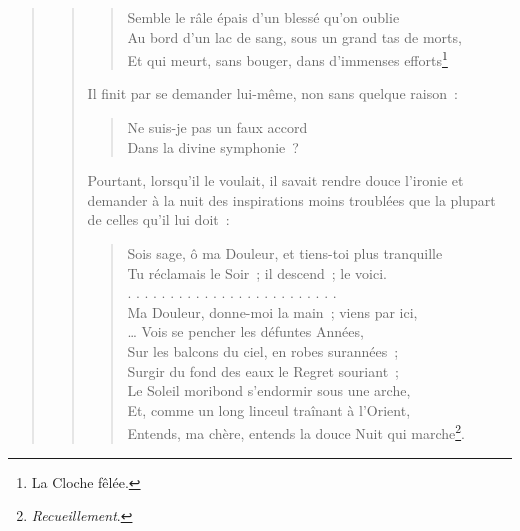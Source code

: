 \documentclass[french,twoside]{book} %
\begin{document}
\begin{verse}
\begin{verse}
\begin{verse}
Semble le râle épais d’un blessé qu’on oublie\\
Au bord d’un lac de sang, sous un grand tas de morts,\\
Et qui meurt, sans bouger, dans d’immenses efforts\footnote{La Cloche fêlée.} \\
\end{verse}

\noindent Il finit par se demander lui-même, non sans quelque raison :\par


\begin{verse}
Ne suis-je pas un faux accord\\
Dans la divine symphonie ?\\
\end{verse}

\noindent Pourtant, lorsqu’il le voulait, il savait rendre douce l’ironie et demander à la nuit des inspirations moins troublées que la plupart de celles qu’il lui doit :\par


\begin{verse}
Sois sage, ô ma Douleur, et tiens-toi plus tranquille\\
Tu réclamais le Soir ; il descend ; le voici.\\
. . . . . . . . . . . . . . . . . . . . . . . . .\\
Ma Douleur, donne-moi la main ; viens par ici,\\
… Vois se pencher les défuntes Années,\\
Sur les balcons du ciel, en robes surannées ;\\
Surgir du fond des eaux le Regret souriant ;\\
Le Soleil moribond s’endormir sous une arche,\\
Et, comme un long linceul traînant à l’Orient,\\
Entends, ma chère, entends la douce Nuit qui marche\footnote{\emph{Recueillement}.}.\\
\end{verse}


\end{verse}
\end{verse}
\end{document}
